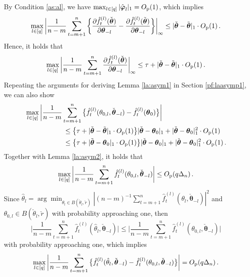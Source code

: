 \documentclass[12pt]{article}
\newcommand{\btheta}{\boldsymbol \theta}
\newcommand{\bvarphi}{\boldsymbol \varphi}
\newcommand{\0}{{\bf 0}}
\begin{document}
By Condition \ref{as:al}, we have $\max_{l\in[q]}|\hat{\bvarphi}_l|_1=O_{\rm p}(1)$, which implies 
\begin{align*}
\max_{l\in[q]}\bigg|\frac{1}{n-m}\sum_{t=m+1}^n\bigg\{\frac{\partial \hat{f}_t^{(l)}(\check{\btheta})}{\partial\btheta_{-l}}-\frac{\partial\hat{f}_t^{(l)}(\tilde{\btheta})}{\partial\btheta_{-l}}\bigg\}\bigg|_\infty\leq|\check{\btheta}-\tilde{\btheta}|_1\cdot O_{\rm p}(1)\,.
\end{align*}
Hence, it holds that 
\begin{align}\label{eq:asymbd10}
\max_{l\in[q]}\bigg|\frac{1}{n-m}\sum_{t=m+1}^n\frac{\partial \hat{f}_t^{(l)}(\check{\btheta})}{\partial\btheta_{-l}}\bigg|_\infty\leq \tau+ |\check{\btheta}-\tilde{\btheta}|_1\cdot O_{\rm p}(1)\,.
\end{align}
Repeating the arguments for deriving Lemma \ref{la:asym1} in Section \ref{pf:laasymp1}, we can also show
\begin{align}
&\max_{l\in[q]}\bigg|\frac{1}{n-m}\sum_{t=m+1}^n\big\{\hat{f}_t^{(l)}(\theta_{0,l},\check{\btheta}_{-l})-\hat{f}_t^{(l)}(\btheta_0)\big\}\bigg|\notag\\
&~~~~~~~~~~~~~~~~~\leq \big\{\tau+|\check{\btheta}-\tilde{\btheta}|_1\cdot O_{\rm p}(1)\big\} |\check{\btheta}-\btheta_{0}|_1+ |\check{\btheta}-\btheta_{0}|_1^2\cdot O_{\rm p}(1)\label{eq:asym15}\\
&~~~~~~~~~~~~~~~~~\leq \big\{\tau+|\tilde{\btheta}-\btheta_0|_1\cdot O_{\rm p}(1)\big\} |\check{\btheta}-\btheta_{0}|_1+ |\check{\btheta}-\btheta_{0}|_1^2\cdot O_{\rm p}(1)\notag\,.
\end{align}
Together with Lemma \ref{la:asym2}, it holds that
\[
\max_{l\in[q]}\bigg|\frac{1}{n-m}\sum_{t=m+1}^n\hat{f}_t^{(l)}(\theta_{0,l},\check{\btheta}_{-l})\bigg|\leq O_{\rm p}(q\Delta_n)\,.
\]
 Since $\hat{\theta}_l=\arg\min_{\theta_l\in B(\check{\theta}_l,\check{r})}|(n-m)^{-1}\sum_{t=m+1}^n\hat{f}_t^{(l)}(\theta_l,\check{\btheta}_{-l})|^2$ and $\theta_{0,l}\in B(\check{\theta}_l,\check{r})$ with probability approaching one, then
 \[
\bigg|\frac{1}{n-m}\sum_{t=m+1}^n\hat{f}_t^{(l)}(\hat{\theta}_{l},\check{\btheta}_{-l})\bigg|\leq \bigg|\frac{1}{n-m}\sum_{t=m+1}^n\hat{f}_t^{(l)}(\theta_{0,l},\check{\btheta}_{-l})\bigg|
\]
with probability approaching one, which implies 
\begin{align}\label{eq:asym11}
\max_{l\in[q]}\bigg|\frac{1}{n-m}\sum_{t=m+1}^n\big\{\hat{f}_t^{(l)}(\hat{\theta}_{l},\check{\btheta}_{-l})-\hat{f}_t^{(l)}(\theta_{0,l},\check{\btheta}_{-l})\big\}\bigg|=O_{\rm p}(q\Delta_n)\,.
\end{align}
\end{document}

